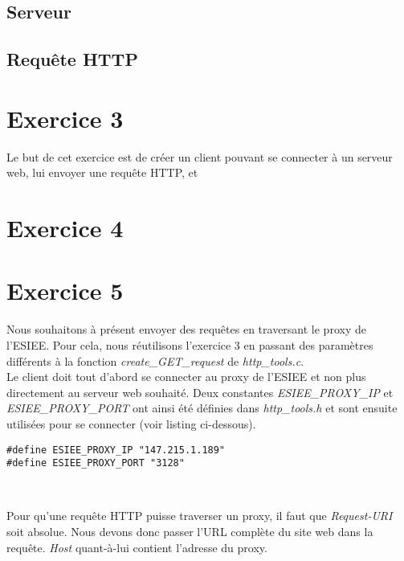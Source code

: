 \documentclass[a4paper, frenchb, 11pt]{article}
\begin{document}
\subsection{Serveur}

\subsection{Requête HTTP}

\newpage

\section{Exercice 3}
Le but de cet exercice est de créer un client pouvant se connecter à un serveur web, lui envoyer une requête HTTP, et %
\newpage

\section{Exercice 4}

\newpage

\section{Exercice 5}
Nous souhaitons à présent envoyer des requêtes en traversant le proxy de l'ESIEE. Pour cela, nous réutilisons l'exercice 3 en passant des paramètres différents à la fonction \emph{create\_GET\_request} de \emph{http\_tools.c}.\\

Le client doit tout d'abord se connecter au proxy de l'ESIEE et non plus directement au serveur web souhaité. Deux constantes \emph{ESIEE\_PROXY\_IP} et \emph{ESIEE\_PROXY\_PORT} ont ainsi été définies dans \emph{http\_tools.h} et sont ensuite utilisées pour se connecter (voir listing ci-dessous).

\begin{lstlisting}[caption=Extrait de http\_tools.h]
#define ESIEE_PROXY_IP "147.215.1.189"
#define ESIEE_PROXY_PORT "3128"
\end{lstlisting}
\

Pour qu'une requête HTTP puisse traverser un proxy, il faut que \emph{Request-URI} soit absolue. Nous devons donc passer l'URL complète du site web dans la requête. \emph{Host} quant-à-lui contient l'adresse du proxy.
\end{document}

